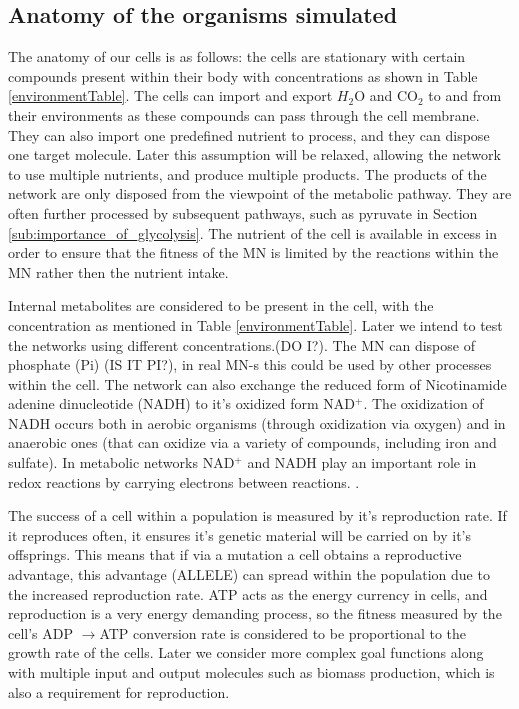 \documentclass[10pt,a4paper]{article}
\begin{document}
	\subsection{Anatomy of the organisms simulated}
	\label{ssub:anatomy_of_the_oganisms_simulated}
	
	The anatomy of our cells is as follows: the cells are stationary with certain compounds present within their body with concentrations as shown in Table \ref{environmentTable}. The cells can import and export $H_2$O and CO$_2$ to and from their environments as these compounds can pass through the cell membrane. They can also import one predefined nutrient to process, and they can dispose one target molecule. Later this assumption will be relaxed, allowing the network to use multiple nutrients, and produce multiple products. The products of the network are only disposed from the viewpoint of the metabolic pathway. They are often further processed by subsequent pathways, such as pyruvate in Section \ref{sub:importance_of_glycolysis}. The nutrient of the cell is available in excess in order to ensure that the fitness of the MN is limited by the reactions within the MN rather then the nutrient intake. 
	
	Internal metabolites are considered to be present in the cell, with the concentration as mentioned in Table \ref{environmentTable}. Later we intend to test the networks using different concentrations.(DO I?). The MN can dispose of phosphate (Pi) (IS IT PI?), in real MN-s this could be used by other processes within the cell. The network can also exchange the reduced form of Nicotinamide adenine dinucleotide (NADH) to it's oxidized form NAD$^+$. The oxidization of NADH occurs both in aerobic organisms (through oxidization via oxygen) and in anaerobic ones (that can oxidize via a variety of compounds, including iron and sulfate). In metabolic networks NAD$^+$ and NADH play an important role in redox reactions by carrying electrons between reactions. \cite{principlesofbio}.

	The success of a cell within a population is measured by it's reproduction rate. If it reproduces often, it ensures it's genetic material will be carried on by it's offsprings. This means that if via a mutation a cell obtains a reproductive advantage, this advantage (ALLELE)  can spread within the population due to the increased reproduction rate. ATP acts as the energy currency in cells, and reproduction is a very energy demanding process, so the fitness  measured by the cell's ADP $\rightarrow$ATP conversion rate is considered to be proportional to the growth rate of the cells. Later we consider more complex goal functions along with multiple input and output molecules such as biomass production, which is also a requirement for reproduction. 
\end{document}
